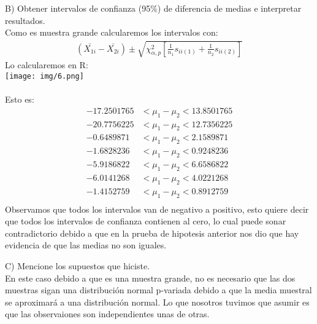 \begin{sol}
\pagebreak
B) Obtener intervalos de confianza (95\%) de diferencia de medias e interpretar resultados.\\
Como es muestra grande calcularemos los intervalos con:
\begin{align*}
(\bar{X_{1i}}-\bar{X_{2i}}) \pm \sqrt{\chi_{\alpha, p}^2 \left[\frac{1}{n_1}s_{ii(1)}+\frac{1}{n_2}s_{ii(2)} \right] }
\end{align*}
Lo calcularemos en R:\\
\texttt{[image: img/6.png]}\\\\
Esto es:
\begin{align*}
-17.2501765 &< \mu_1 - \mu_2 < 13.8501765 \\
-20.7756225 &< \mu_1 - \mu_2 < 12.7356225 \\
-0.6489871  &< \mu_1 - \mu_2 < 2.1589871 \\
-1.6828236  &< \mu_1 - \mu_2 < 0.9248236 \\
-5.9186822  &< \mu_1 - \mu_2 < 6.6586822 \\
-6.0141268  &< \mu_1 - \mu_2 < 4.0221268 \\
-1.4152759  &< \mu_1 - \mu_2 < 0.8912759 \\
\end{align*}
Observamos que todos los intervalos van de negativo a positivo, esto quiere decir que todos los intervalos de confianza contienen al cero, lo cual puede sonar contradictorio debido a que en la prueba de hipotesis anterior nos dio que hay evidencia de que las medias no son iguales.

\pagebreak

C) Mencione los supuestos que hiciste.\\
En este caso debido a que es una muestra grande, no es necesario que las dos muestras sigan una distribución normal p-variada debido a que la media muestral se aproximará a una distribución normal. Lo que nosotros tuvimos que asumir es que las observaiones son independientes unas de otras.
\end{sol}
